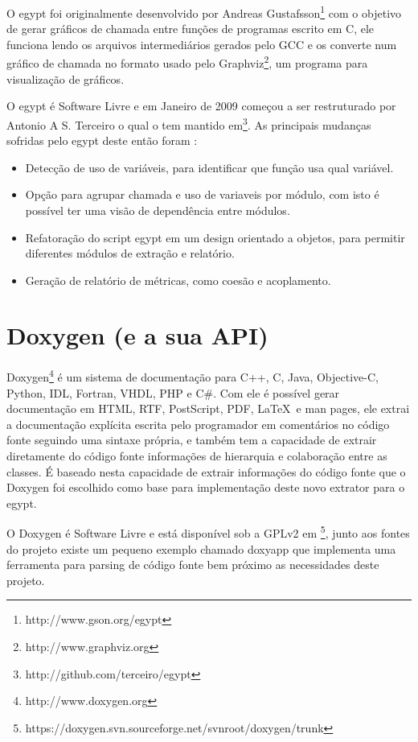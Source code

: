 O egypt foi originalmente desenvolvido por Andreas
Gustafsson\footnote{http://www.gson.org/egypt} com o objetivo de gerar gráficos
de chamada entre funções de programas escrito em C, ele funciona lendo os
arquivos intermediários gerados pelo GCC e os
converte num gráfico de chamada no formato usado pelo
Graphviz\footnote{http://www.graphviz.org}, um programa para visualização de
gráficos.

O egypt é Software Livre e em Janeiro de 2009 começou a ser restruturado por
Antonio A S. Terceiro o qual o tem mantido
em\footnote{http://github.com/terceiro/egypt}. As principais mudanças sofridas
pelo egypt deste então foram \cite{StructuralComplexityEvolution}:

\begin{itemize}
\item Detecção de uso de variáveis, para identificar que função usa qual
variável.
\item Opção para agrupar chamada e uso de variaveis por módulo, com isto é
possível ter uma visão de dependência entre módulos.
\item Refatoração do script egypt em um design orientado a objetos, para
permitir diferentes módulos de extração e relatório.
\item Geração de relatório de métricas, como coesão e acoplamento.
\end{itemize}

\section{Doxygen (e a sua API)}

Doxygen\footnote{http://www.doxygen.org} é um sistema de documentação para C++,
C, Java, Objective-C, Python, IDL, Fortran, VHDL, PHP e C\#. Com ele é possível
gerar documentação em HTML, RTF, PostScript, PDF, \LaTeX\ e man pages, ele extrai a
documentação explícita escrita pelo programador em comentários no código fonte
seguindo uma sintaxe própria, e também tem a capacidade de extrair diretamente
do código fonte informações de hierarquia e colaboração entre as classes. É
baseado nesta capacidade de extrair informações do código fonte que
o Doxygen foi escolhido como base para implementação deste novo extrator para o
egypt.

O Doxygen é Software Livre e está disponível sob a GPLv2 em
\footnote{https://doxygen.svn.sourceforge.net/svnroot/doxygen/trunk}, junto aos
fontes do projeto existe um pequeno exemplo chamado doxyapp que implementa uma
ferramenta para parsing de código fonte bem próximo as necessidades deste
projeto.

